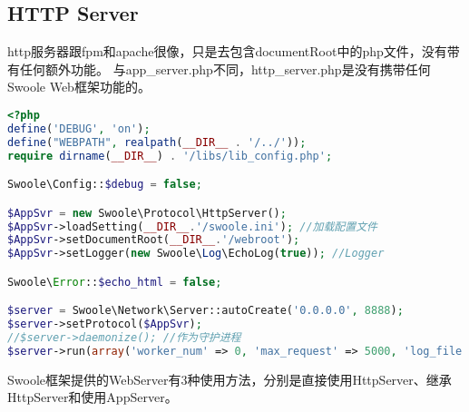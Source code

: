 \subsection{HTTP Server}


http服务器跟fpm和apache很像，只是去包含documentRoot中的php文件，没有带有任何额外功能。 与app\_server.php不同，http\_server.php是没有携带任何Swoole Web框架功能的。



\begin{lstlisting}[language=PHP]
<?php
define('DEBUG', 'on');
define("WEBPATH", realpath(__DIR__ . '/../'));
require dirname(__DIR__) . '/libs/lib_config.php';

Swoole\Config::$debug = false;

$AppSvr = new Swoole\Protocol\HttpServer();
$AppSvr->loadSetting(__DIR__.'/swoole.ini'); //加载配置文件
$AppSvr->setDocumentRoot(__DIR__.'/webroot');
$AppSvr->setLogger(new Swoole\Log\EchoLog(true)); //Logger

Swoole\Error::$echo_html = false;

$server = Swoole\Network\Server::autoCreate('0.0.0.0', 8888);
$server->setProtocol($AppSvr);
//$server->daemonize(); //作为守护进程
$server->run(array('worker_num' => 0, 'max_request' => 5000, 'log_file' => '/tmp/swoole.log'));
\end{lstlisting}



Swoole框架提供的WebServer有3种使用方法，分别是直接使用HttpServer、继承HttpServer和使用AppServer。

